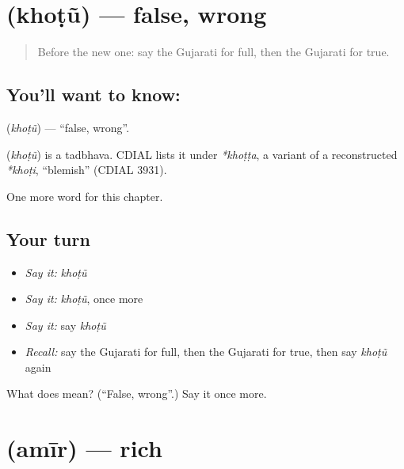 \section[\texorpdfstring{\gu{ખોટું} (khoṭũ)}{ખોટું (khoṭũ)}]{ (khoṭũ) — false, wrong}

\label{lesson:GU-C136-khotu}



\begin{quote}
Before the new one: say the Gujarati for full, then the Gujarati for true.
\end{quote}

\subsection*{You'll want to know: }
\textbf{} (\emph{khoṭũ}) — \textquotedblleft{}false, wrong\textquotedblright{}.

\begin{cousinweb}
\textbf{} (\emph{khoṭũ}) is a tadbhava. CDIAL lists it under \emph{*khoṭṭa}, a variant of a reconstructed \emph{*khoṭi}, \textquotedblleft{}blemish\textquotedblright{} (CDIAL 3931).
\end{cousinweb}

\begin{grammarlens}[title={What you've built}]
One more word for this chapter.
\end{grammarlens}

\subsection*{Your turn}
\begin{itemize}
\raggedright
  \item \emph{Say it:} \emph{khoṭũ}
  \item \emph{Say it:} \emph{khoṭũ}, once more
  \item \emph{Say it:} say \emph{khoṭũ}
  \item \emph{Recall:} say the Gujarati for full, then the Gujarati for true, then say \emph{khoṭũ} again
\end{itemize}

\begin{tcolorbox}[breakable,colback=teal!4,colframe=teal!35!black,title={Before you move on}]
What does  mean? (\textquotedblleft{}False, wrong\textquotedblright{}.) Say it once more.
\end{tcolorbox}
\section[\texorpdfstring{\gu{અમીર} (amīr)}{અમીર (amīr)}]{ (amīr) — rich}

